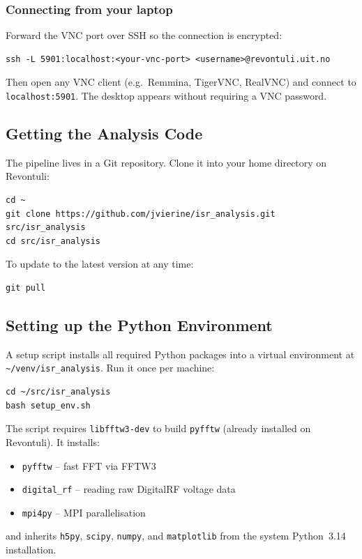 \subsubsection*{Connecting from your laptop}

Forward the VNC port over SSH so the connection is encrypted:
\begin{verbatim}
ssh -L 5901:localhost:<your-vnc-port> <username>@revontuli.uit.no
\end{verbatim}
Then open any VNC client (e.g.\ Remmina, TigerVNC, RealVNC) and connect
to \texttt{localhost:5901}.
The desktop appears without requiring a VNC password.

\subsection{Getting the Analysis Code}

The pipeline lives in a Git repository.
Clone it into your home directory on Revontuli:
\begin{verbatim}
cd ~
git clone https://github.com/jvierine/isr_analysis.git src/isr_analysis
cd src/isr_analysis
\end{verbatim}
To update to the latest version at any time:
\begin{verbatim}
git pull
\end{verbatim}

\subsection{Setting up the Python Environment}

A setup script installs all required Python packages into a virtual
environment at \texttt{\textasciitilde/venv/isr_analysis}.
Run it once per machine:
\begin{verbatim}
cd ~/src/isr_analysis
bash setup_env.sh
\end{verbatim}
The script requires \texttt{libfftw3-dev} to build \texttt{pyfftw}
(already installed on Revontuli).
It installs:
\begin{itemize}
  \item \texttt{pyfftw} -- fast FFT via FFTW3
  \item \texttt{digital\_rf} -- reading raw DigitalRF voltage data
  \item \texttt{mpi4py} -- MPI parallelisation
\end{itemize}
and inherits \texttt{h5py}, \texttt{scipy}, \texttt{numpy}, and
\texttt{matplotlib} from the system Python~3.14 installation.

